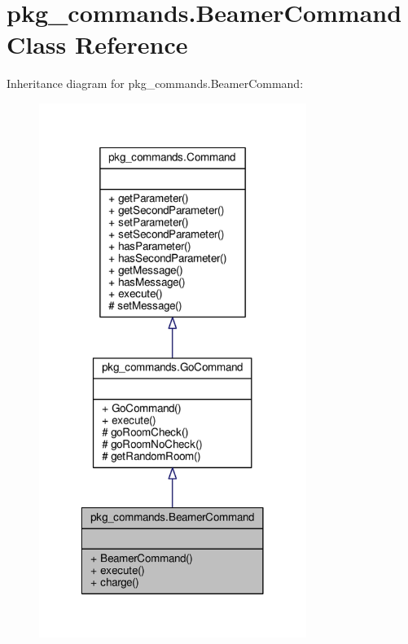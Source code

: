 \hypertarget{classpkg__commands_1_1BeamerCommand}{\section{pkg\-\_\-commands.\-Beamer\-Command Class Reference}
\label{classpkg__commands_1_1BeamerCommand}
}


Inheritance diagram for pkg\-\_\-commands.\-Beamer\-Command\-:
\nopagebreak
\begin{figure}[H]
\begin{center}
\leavevmode
\includegraphics[width=246pt]{classpkg__commands_1_1BeamerCommand__inherit__graph}
\end{center}
\end{figure}


